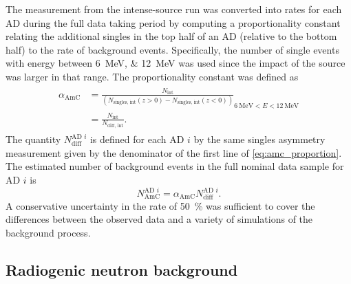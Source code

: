 The measurement from the intense-source run was converted
into rates for each AD during the full data taking period
by computing a proportionality constant
relating the additional singles in the top half of an AD
(relative to the bottom half)
to the rate of \amc{} background events.
Specifically, the number of single events
with energy between \SIlist{6;12}{\MeV} was used
since the impact of the \amc{} source was larger in that range.
The proportionality constant was defined as
\begin{align}\label{eq:amc_proportion}
    \begin{split}
        \alpha_\text{AmC} &= \frac{N_\text{int}}{
            (N_\text{singles, int}(z>0) - N_\text{singles, int}(z < 0))
        }_
        {
            \SI{6}{\MeV} < E < \SI{12}{\MeV}
        } \\
        &= \frac{N_\text{int}}{N_\text{diff, int}}.
    \end{split}
\end{align}
The quantity $N_\text{diff}^{\text{AD }i}$ is defined for each AD $i$
by the same singles asymmetry measurement
given by the denominator of the first line of \cref{eq:amc_proportion}.
The estimated number of \amc{} background events
in the full nominal data sample for AD $i$ is
\begin{equation}\label{eq:amc_count}
    N_\text{AmC}^{\text{AD }i} = \alpha_\text{AmC} N_\text{diff}^{\text{AD }i}.
\end{equation}
A conservative uncertainty in the rate of \SI{50}{\percent}
was sufficient to cover the differences between the observed data
and a variety of simulations of the \amc{} background process.

\subsection{Radiogenic neutron background}
\label{subsec:radn}

